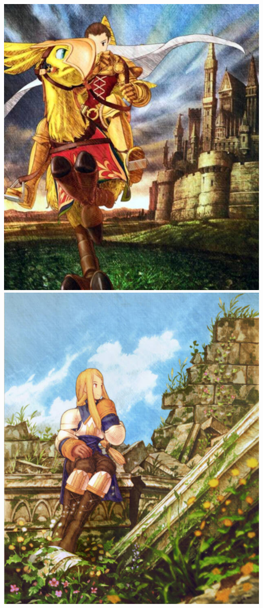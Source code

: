 \includegraphics[width=\columnwidth]{./art/images/delita2.jpg} 	
\pagebreak\\
\includegraphics[width=\columnwidth]{./art/images/agrias.jpg}
